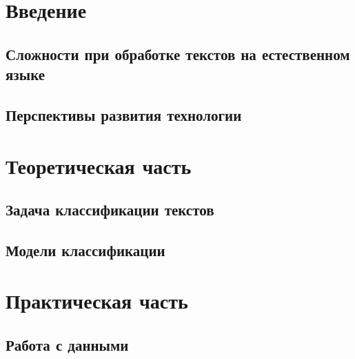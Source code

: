 \documentclass{article}
\begin{document}
\renewcommand*\contentsname{Содержание}
\makeatletter
\renewcommand{\l@section}{\@dottedtocline{1}{0em}{2em}}
\renewcommand{\l@subsection}{\@dottedtocline{1}{0em}{2.6em}}
\renewcommand{\l@subsubsection}{\@dottedtocline{1}{0em}{3.2em}}

\makeatother
\setcounter{page}{2}

\begin{center}
	\tableofcontents
\end{center}
\newpage
{}
\section*{Введение}
\newpage
\subsection{Сложности при обработке текстов на естественном языке}
\newpage
\subsection{Перспективы развития технологии}
\newpage
\section{Теоретическая часть} 
\newpage
\subsection{Задача классификации текстов}
\newpage
\subsection{Модели классификации}
\newpage
\section{Практическая часть}
\subsection{Работа с данными}
\newpage
{}
\end{document}
